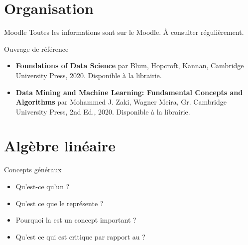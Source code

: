 \documentclass[a4paper]{article}
\begin{document}

	\section{Organisation}
	\begin{parag}{Moodle}
		Toutes les informations sont sur le Moodle. À consulter régulièrement.
	\end{parag}
	
	\begin{parag}{Ouvrage de référence}
		\begin{itemize}
			\item \textbf{Foundations of Data Science} par Blum, Hopcroft, Kannan, Cambridge University Press, 2020. Disponible à la librairie.
			\item \textbf{Data Mining and Machine Learning: Fundamental Concepts and Algorithms} par Mohammed J. Zaki, Wagner Meira, Gr. Cambridge University Press, 2nd Ed., 2020. Disponible à la librairie.
		\end{itemize}
	\end{parag}

	\section{Algèbre linéaire}
	\begin{parag}{Concepts généraux}
		\begin{itemize}
			\item Qu'est-ce qu'un  ?
			\item Qu'est ce que le  représente ?
			\item Pourquoi la  est un concept important ?
			\item Qu'est ce qui est critique par rapport au  ?
		\end{itemize}
	\end{parag}
\end{document}
